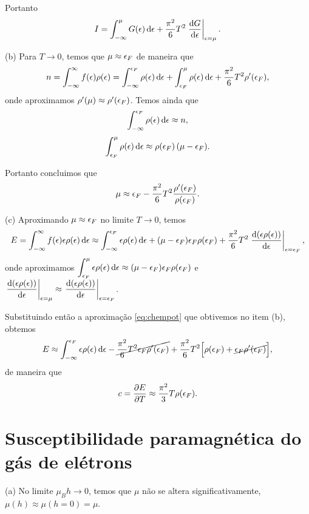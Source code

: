 \documentclass[a4paper,10pt]{article}
\begin{document}
Portanto
$$
I = \int_{-\infty}^{\mu} G(\eps) \dd{\eps} + \frac{\pi^2}{6} T^2 \eval{\dv{G}{\eps}}_{\eps = \mu}.
$$

(b) Para $T \to 0$, temos que $\mu \approx \epsilon_F$ de maneira que
$$
n = \int_{-\infty}^{\infty} f(\epsilon) \rho(\epsilon) =
\int_{-\infty}^{\epsilon_F} \rho(\epsilon) \dd{\epsilon} +
\int_{\epsilon_F}^{\mu} \rho(\epsilon) \dd{\epsilon} +
\frac{\pi^2}{6} T^2 \rho'(\epsilon_F),
$$
onde aproximamos $\rho'(\mu) \approx \rho'(\epsilon_F)$. Temos ainda que
$$
\int_{-\infty}^{\epsilon_F} \rho(\epsilon) \dd{\epsilon} \approx n,
$$
$$
\int_{\epsilon_F}^{\mu} \rho(\epsilon) \dd{\epsilon} \approx \rho(\epsilon_F) \, (\mu - \epsilon_F).
$$

Portanto concluimos que
\begin{equation} \label{eq:chempot}
\mu \approx \epsilon_F - \frac{\pi^2}{6} T^2 \frac{\rho'(\epsilon_F)}{\rho(\epsilon_F)}.
\end{equation}

(c) Aproximando $\mu \approx \epsilon_F$ no limite $T \to 0$, temos
$$
E = \int_{-\infty}^{\infty} f(\eps) \eps \rho(\eps) \dd{\eps} \approx
\int_{-\infty}^{\eps_F} \eps \rho(\eps) \dd{\eps} +
(\mu - \eps_F) \eps_F \rho(\eps_F) +
\frac{\pi^2}{6} T^2 \eval{\dv{(\eps \rho(\eps))}{\eps}}_{\eps = \eps_F},
$$
onde aproximamos $\displaystyle{\int_{\epsilon_F}^{\mu} \epsilon\rho(\epsilon) \dd{\epsilon} \approx (\mu - \epsilon_F) \epsilon_F \rho(\epsilon_F)}$ e $\displaystyle{\eval{\dv{(\eps \rho(\eps))}{\eps}}_{\eps = \mu} \approx \eval{\dv{(\eps \rho(\eps))}{\eps}}_{\eps = \eps_F}}$.

\n

Substituindo então a aproximação \ref{eq:chempot} que obtivemos no item (b), obtemos
$$
E \approx \int_{-\infty}^{\epsilon_F} \epsilon \rho(\epsilon) \dd{\epsilon}
- \cancel{ \frac{\pi^2}{6} T^2 \epsilon_F \rho'(\epsilon_F) } +
\frac{\pi^2}{6} T^2 \Big[\rho(\epsilon_F) + \cancel{ \epsilon_F \rho'(\epsilon_F) } \Big],
$$
de maneira que
$$
c = \pdv{E}{T} \approx \frac{\pi^2}{3} T \rho(\epsilon_F).
$$


\pagebreak

\section{Susceptibilidade paramagnética do gás de elétrons}

(a) No limite $\mu_B h \to 0$, temos que $\mu$ não se altera significativamente, $\mu(h) \approx \mu(h = 0) = \mu$.
\end{document}
